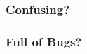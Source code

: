 \documentclass[12pt,handout]{beamer}
\begin{document}
% 

{
\begin{frame}[plain]
\frametitle{Confusing?}
\end{frame}
}

{
\begin{frame}[plain]
\frametitle{Full of Bugs?}
\end{frame}
}
\end{document}
